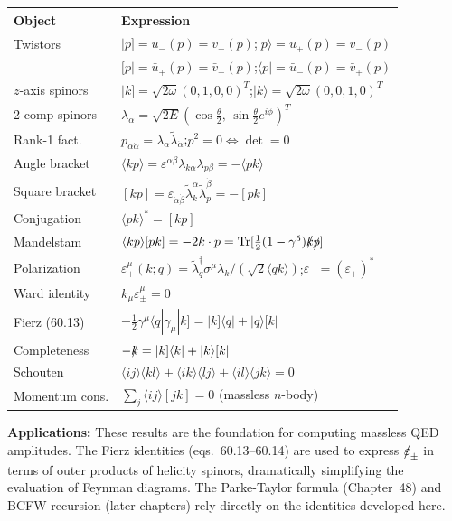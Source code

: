 \documentclass[12pt]{article}
\begin{document}
\begin{center}
\renewcommand{\arraystretch}{1.5}
\begin{tabular}{@{}ll@{}}
  \toprule
  Object & Expression \\
  \midrule
  Twistors & $|p]=u_-(p)=v_+(p)$;\quad $|p\rangle=u_+(p)=v_-(p)$ \\
  & $[p|=\bar u_+(p)=\bar v_-(p)$;\quad $\langle p|=\bar u_-(p)=\bar v_+(p)$ \\
  $z$-axis spinors & $|k]=\sqrt{2\omega}(0,1,0,0)^T$;\quad $|k\rangle=\sqrt{2\omega}(0,0,1,0)^T$ \\
  2-comp spinors & $\lambda_\alpha=\sqrt{2E}(\cos\tfrac\theta2,\,\sin\tfrac\theta2 e^{i\phi})^T$ \\
  Rank-1 fact. & $p_{\alpha\dot\alpha}=\lambda_\alpha\tilde\lambda_{\dot\alpha}$;\quad $p^2=0\Leftrightarrow\det=0$ \\
  Angle bracket & $\langle kp\rangle = \varepsilon^{\alpha\beta}\lambda_{k\alpha}\lambda_{p\beta} = -\langle pk\rangle$ \\
  Square bracket & $[kp] = \varepsilon_{\dot\alpha\dot\beta}\tilde\lambda_k^{\dot\alpha}\tilde\lambda_p^{\dot\beta} = -[pk]$ \\
  Conjugation & $\langle pk\rangle^* = [kp]$ \\
  Mandelstam & $\langle kp\rangle[pk] = -2k\cdot p = \mathrm{Tr}[\tfrac12(1-\gamma^5)\slashed{k}\slashed{p}]$ \\
  Polarization & $\varepsilon_+^\mu(k;q) = \tilde\lambda_q^\dagger\sigma^\mu\lambda_k/(\sqrt{2}\langle qk\rangle)$;\quad $\varepsilon_-=(\varepsilon_+)^*$ \\
  Ward identity & $k_\mu\varepsilon_\pm^\mu=0$ \\
  Fierz (60.13) & $-\tfrac12\gamma^\mu\langle q|\gamma_\mu|k]=|k]\langle q|+|q\rangle[k|$ \\
  Completeness & $-\slashed{k}=|k]\langle k|+|k\rangle[k|$ \\
  Schouten & $\langle ij\rangle\langle kl\rangle+\langle ik\rangle\langle lj\rangle+\langle il\rangle\langle jk\rangle=0$ \\
  Momentum cons. & $\sum_j\langle ij\rangle[jk]=0$ (massless $n$-body) \\
  \bottomrule
\end{tabular}
\end{center}

\bigskip
\noindent\textbf{Applications:} These results are the foundation for computing
massless QED amplitudes.  The Fierz identities (eqs.~60.13--60.14) are used
to express $\slashed\varepsilon_\pm$ in terms of outer products of helicity
spinors, dramatically simplifying the evaluation of Feynman diagrams.
The Parke-Taylor formula (Chapter~48) and BCFW recursion (later chapters)
rely directly on the identities developed here.
\end{document}
